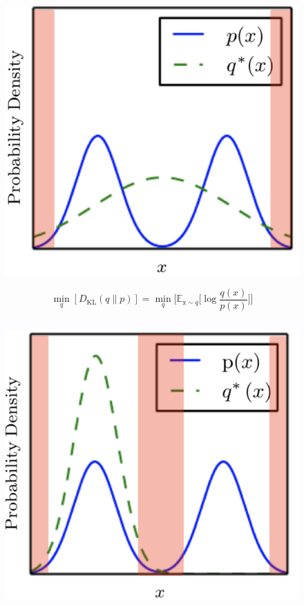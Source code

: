 \begin{figure}[!h]
    \includegraphics[scale=.5]{images/prerequisites/kl02.png}
    \centering
\end{figure}
\begin{equation}
    \min_q[D_{\text{KL}}(q\|p)]=\min_q\Big[ \mathbb{E}_{\text{x}\sim q}\Big[\log\frac{q(x)}{p(x)} \Big]\Big]
\end{equation}
\begin{figure}[!h]
    \includegraphics[scale=.5]{images/prerequisites/kl03.png}
    \centering
\end{figure}
\newpage
